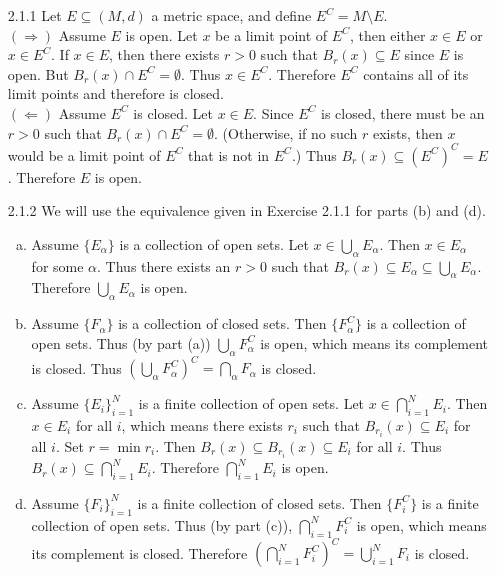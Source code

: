 \documentclass[../../Solutions.tex]{subfiles}
\begin{document}
\begin{itemize}
	\item [2.1.1] Let $E \subseteq (M,d)$ a metric space, and define $E^C = M \setminus E$. \\
		$(\Rightarrow)$ Assume $E$ is open.
		Let $x$ be a limit point of $E^C$, then either $x \in E$ or $x \in E^C$.
		If $x \in E$, then there exists $r > 0$ such that $B_r(x) \subseteq E$ since $E$ is open.
		But $B_r(x) \cap E^C = \emptyset$.
		Thus $x \in E^C$.
		Therefore $E^C$ contains all of its limit points and therefore is closed. \\
		$(\Leftarrow)$ Assume $E^C$ is closed.
		Let $x \in E$.
		Since $E^C$ is closed, there must be an $r > 0$ such that $B_r(x) \cap E^C = \emptyset$.
		(Otherwise, if no such $r$ exists, then $x$ would be a limit point of $E^C$ that is not in $E^C$.)
		Thus $B_r(x) \subseteq \left(E^C\right)^C = E$.
		Therefore $E$ is open.
	
	\item [2.1.2] We will use the equivalence given in Exercise 2.1.1 for parts (b) and (d).
	\begin{enumerate}[(a)]
		\item Assume $\{E_\alpha\}$ is a collection of open sets.
			Let $x \in \bigcup_\alpha E_\alpha$.
			Then $x \in E_\alpha$ for some $\alpha$.
			Thus there exists an $r > 0$ such that $B_r(x) \subseteq E_\alpha \subseteq \bigcup_\alpha E_\alpha$.
			Therefore $\bigcup_\alpha E_\alpha$ is open.
		\item Assume $\{F_\alpha\}$ is a collection of closed sets.
			Then $\{F_\alpha^C\}$ is a collection of open sets.
			Thus (by part (a)) $\bigcup_\alpha F_\alpha^C$ is open, which means its complement is closed.
			Thus $\left(\bigcup_\alpha F_\alpha^C\right)^C = \bigcap_\alpha F_\alpha$ is closed.
		\item Assume $\{E_i\}_{i=1}^N$ is a finite collection of open sets.
			Let $x \in \bigcap_{i=1}^N E_i$.
			Then $x \in E_i$ for all $i$, which means there exists $r_i$ such that $B_{r_i}(x) \subseteq E_i$ for all $i$.
			Set $r = \min{r_i}$.
			Then $B_r(x) \subseteq B_{r_i}(x) \subseteq E_i$ for all $i$.
			Thus $B_r(x) \subseteq \bigcap_{i=1}^N E_i$.
			Therefore $\bigcap_{i=1}^N E_i$ is open.
		\item Assume $\{F_i\}_{i=1}^N$ is a finite collection of closed sets.
			Then $\{F_i^C\}$ is a finite collection of open sets.
			Thus (by part (c)), $\bigcap_{i=1}^N F_i^C$ is open, which means its complement is closed.
			Therefore $\left(\bigcap_{i=1}^N F_i^C\right)^C = \bigcup_{i=1}^N F_i$ is closed.
	\end{enumerate}
	

\end{itemize}
\end{document}
